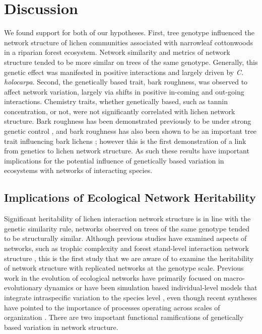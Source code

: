 \documentclass[fleqn,12pt]{olplainarticle}
\begin{document}
\section*{Discussion}


We found support for both of our hypotheses. First, tree genotype
influenced the network structure of lichen communities associated with
narrowleaf cottonwoods in a riparian forest ecosystem. Network
similarity and metrics of network structure tended to be more similar
on trees of the same genotype. Generally, this genetic effect was
manifested in positive interactions and largely driven by
\textit{C. holocarpa}. Second, the genetically based trait, bark
roughness, was observed to affect network variation, largely via
shifts in positive in-coming and out-going interactions. Chemistry
traits, whether genetically based, such as tannin concentration, or
not, were not significantly correlated with lichen network
structure. Bark roughness has been demonstrated previously to be under
strong genetic control \citep{Bdeir2017}, and bark roughness has also
been shown to be an important tree trait influencing bark lichens
\citep{Lamit2015a}; however this is the first demonstration of a link
from genetics to lichen network structure.  As such these results have
important implications for the potential influence of genetically
based variation in ecosystems with networks of interacting species.


\subsection*{Implications of Ecological Network Heritability}

Significant heritability of lichen interaction network structure is in
line with the genetic similarity rule, networks observed on trees of
the same genotype tended to be structurally similar. Although previous
studies have examined aspects of networks, such as trophic complexity
\citep{Barbour2016GeneticComplexity} and forest stand-level
interaction network structure \citep{Lau2016GenotypicEvolution,
  Keith2017}, this is the first study that we are aware of to examine
the heritability of network structure with replicated networks at the
genotype scale. Previous work in the evolution of ecological networks
have primarily focused on macro-evolutionary dynamics
\citep{Rezende2007, Weber2017EvolutionMacroevolution,
  Valverde2018TheSpandrel, Harmon2019DetectingInteractions} or have
been simulation based individual-level models that integrate
intraspecific variation to the species level
\citep{Maliet2020AnNetworks}, even though recent syntheses have pointed
to the importance of processes operating across scales of organization
\citep{Guimaraes2020TheOrganization}. There are two important
functional ramifications of genetically based variation in network
structure.
\end{document}
